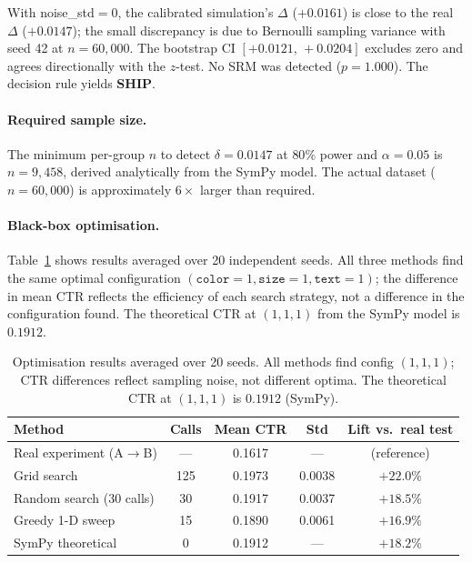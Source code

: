 \documentclass[a4paper,12pt]{extarticle}
\numberwithin{equation}{section}
\begin{document}
With noise\_std$=0$, the calibrated simulation's $\Delta$ ($+0.0161$)
is close to the real $\Delta$ ($+0.0147$); the small discrepancy is due
to Bernoulli sampling variance with seed 42 at $n = 60{,}000$. The
bootstrap CI $[+0.0121,\, +0.0204]$ excludes zero and agrees directionally
with the $z$-test. No SRM was detected ($p = 1.000$). The decision rule
yields \textbf{SHIP}.

\paragraph{Required sample size.} The minimum per-group $n$ to detect
$\delta = 0.0147$ at $80\%$ power and $\alpha = 0.05$ is $n = 9{,}458$,
derived analytically from the SymPy model. The actual dataset
($n = 60{,}000$) is approximately $6\times$ larger than required.

\paragraph{Black-box optimisation.} Table~\ref{tab:optim} shows results
averaged over 20 independent seeds. All three methods find the same
optimal configuration $(\texttt{color}=1, \texttt{size}=1,
\texttt{text}=1)$; the difference in mean CTR reflects the efficiency
of each search strategy, not a difference in the configuration found.
The theoretical CTR at $(1,1,1)$ from the SymPy model is $0.1912$.

\begin{table}[ht]
\centering
\caption{Optimisation results averaged over 20 seeds. All methods find
config $(1,1,1)$; CTR differences reflect sampling noise, not different
optima. The theoretical CTR at $(1,1,1)$ is $0.1912$ (SymPy).}
\label{tab:optim}
\begin{tabular}{lcccc}
\toprule
\textbf{Method} & \textbf{Calls} & \textbf{Mean CTR}
    & \textbf{Std} & \textbf{Lift vs.\ real test} \\
\midrule
Real experiment (A$\to$B)    & ---  & 0.1617 & ---    & (reference) \\
Grid search                  & 125  & 0.1973 & 0.0038 & $+22.0\%$ \\
Random search (30 calls)     &  30  & 0.1917 & 0.0037 & $+18.5\%$ \\
Greedy 1-D sweep             &  15  & 0.1890 & 0.0061 & $+16.9\%$ \\
SymPy theoretical            &   0  & 0.1912 & ---    & $+18.2\%$ \\
\bottomrule
\end{tabular}
\end{table}
\end{document}
